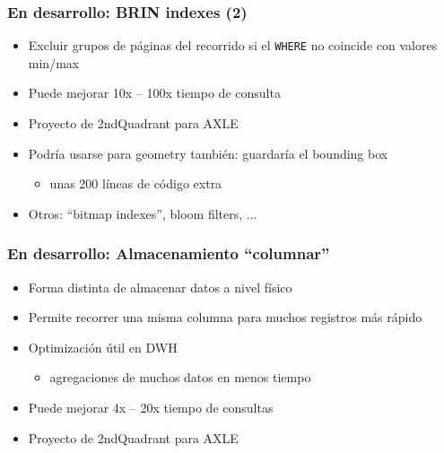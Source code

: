 {

}

\frame
{ \frametitle{En desarrollo: BRIN indexes (2)}
	\begin{itemize}
		\item Excluir grupos de páginas del recorrido si el \texttt{WHERE} no coincide con valores min/max
		\item Puede mejorar 10x -- 100x tiempo de consulta
		\item Proyecto de 2ndQuadrant para AXLE
			\pause
		\item Podría usarse para geometry también: guardaría el bounding box
			\begin{itemize}
				\item  unas 200 líneas de código extra
			\end{itemize}
		\item Otros: “bitmap indexes”, bloom filters, ...

	\end{itemize}
}

\frame
{ \frametitle{En desarrollo: Almacenamiento “columnar”}

\begin{itemize}
	\item Forma distinta de almacenar datos a nivel físico
	\item Permite recorrer una misma columna para muchos registros más rápido
	\item Optimización útil en DWH
		\begin{itemize}
			\item agregaciones de muchos datos en menos tiempo
		\end{itemize}
	\item Puede mejorar 4x -- 20x tiempo de consultas
	\item Proyecto de 2ndQuadrant para AXLE
\end{itemize}
}

